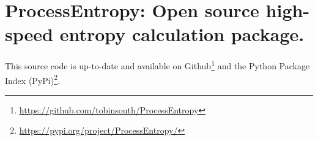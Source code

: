 
\chapter{ProcessEntropy: Open source high-speed entropy calculation package.\label{app:code}}

This source code is up-to-date and available on Github\footnote{\url{https://github.com/tobinsouth/ProcessEntropy}} and the Python Package Index (PyPi)\footnote{\url{https://pypi.org/project/ProcessEntropy/}}.














